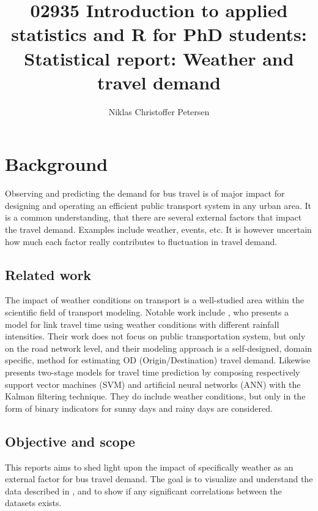 \documentclass[a4paper,11pt]{article}
\title{{\small 02935 Introduction to applied statistics and R for PhD students: }\\[1em]Statistical report: Weather and travel demand}
\author{Niklas Christoffer Petersen}
\affil{Transport Modelling, Department of Management Engineering \\ Technical University of Denmark, 2800 Kongens Lyngby, Denmark}
\begin{document}
\singlespace
\maketitle
\thispagestyle{empty}
\clearpage

\onehalfspacing
{}
\tableofcontents
\clearpage
\glsaddall
\printglossaries


\clearpage

\section{Background}\label{ch:background}

Observing and predicting the demand for bus travel is of major impact for designing and operating an efficient public transport system in any urban area. It is a common understanding, that there are several external factors that impact the travel demand. Examples include weather, events, etc. It is however uncertain how much each factor really contributes to fluctuation in travel demand. 


\subsection{Related work}\label{ch:relatedWork}
The impact of weather conditions on transport is a well-studied area within the scientific field of transport modeling. Notable work include \citet{Lam2008}, who presents a model for link travel time using weather conditions with different rainfall intensities. Their work does not focus on public transportation system, but only on the road network level, and their modeling approach is a self-designed, domain specific, method for estimating OD (Origin/Destination) travel demand.
Likewise \citet{Yo2010} presents two-stage models for travel time prediction by composing respectively support vector machines (SVM) and artificial neural networks (ANN) with the Kalman filtering technique. They do include weather conditions, but only in the form of binary indicators for sunny days and rainy days are considered. 

\subsection{Objective and scope}\label{ch:objective}
This reports aims to shed light upon the impact of specifically weather as an external factor for bus travel demand. The goal is to visualize and understand the data described in , and to show if any significant correlations between the datasets exists.
\end{document}
